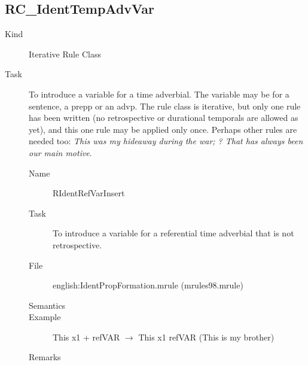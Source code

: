 \subsection{RC\_IdentTempAdvVar}
\begin{description}
\item[Kind] Iterative Rule Class
\item[Task] To introduce a variable for a time adverbial. The variable may be 
for a sentence, a prepp or an advp. The rule class is iterative, but only one 
rule has been written (no retrospective or durational temporals are allowed as 
yet), and this one rule may be applied only once. Perhaps other rules are 
needed too: {\em This was my hideaway during the war; ? That has always been 
our main motive}.

\vspace{1 cm}
\begin{description}
\item[Name] RIdentRefVarInsert
\item[Task] To introduce a variable for a referential time adverbial that is 
not retrospective.
\item[File] english:IdentPropFormation.mrule (mrules98.mrule)
\item[Semantics]
\item[Example] This x1 + refVAR $\rightarrow$ This x1 refVAR (This is my 
brother)
\item[Remarks]
\end{description}

\end{description}

\newpage
